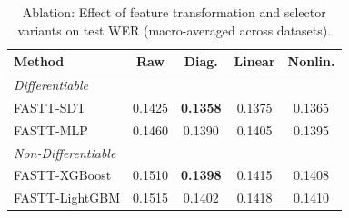\begin{table}[t]
    \centering
    \caption{Ablation: Effect of feature transformation and selector variants on
    test WER (macro-averaged across datasets).}
    \label{tab:ablation_transform} \small
    \begin{tabular}{lcccc}
        \toprule \textbf{Method}                                & \textbf{Raw} & \textbf{Diag.}  & \textbf{Linear} & \textbf{Nonlin.} \\
        \midrule \multicolumn{5}{l}{\textit{Differentiable}}     \\
        FASTT-SDT                                               & 0.1425       & \textbf{0.1358} & 0.1375          & 0.1365           \\
        FASTT-MLP                                               & 0.1460       & 0.1390          & 0.1405          & 0.1395           \\
        \midrule \multicolumn{5}{l}{\textit{Non-Differentiable}} \\
        FASTT-XGBoost                                           & 0.1510       & \textbf{0.1398} & 0.1415          & 0.1408           \\
        FASTT-LightGBM                                          & 0.1515       & 0.1402          & 0.1418          & 0.1410           \\
        \bottomrule
    \end{tabular}
\end{table}